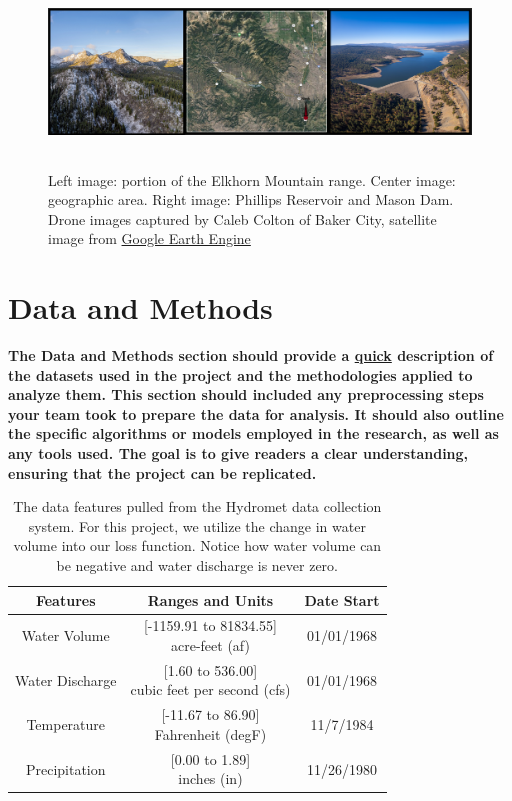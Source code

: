 \documentclass[10pt,twocolumn,letterpaper]{article}
\begin{document}
\begin{figure}[h!]
    \centering
    \includegraphics[width=\textwidth,height=5cm]{moun_mpa_res.png}
    \caption{Left image: portion of the Elkhorn Mountain range. Center image:  geographic area. Right image: Phillips Reservoir and Mason Dam. Drone images captured by Caleb Colton of Baker City, satellite image from \href{https://earth.google.com/web/@44.7920366,-117.99706468,1613.48832994a,83090.25038931d,35y,0h,0t,0r/data=OgMKATA}{Google Earth Engine} }
    \label{fig:enter-label}
\end{figure}

\section{Data and Methods}

\textbf{The Data and Methods section should provide a \underline{quick} description of the datasets used in the project and the methodologies applied to analyze them. This section should included any preprocessing steps your team took to prepare the data for analysis. It should also outline the specific algorithms or models employed in the research, as well as any tools used. The goal is to give readers a clear understanding, ensuring that the project can be replicated.}

\def\arraystretch{1.5}
\begin{table}
\begin{center}
\small
\begin{tabular}{|c|c|c|}
\hline
\textbf{Features} & \textbf{Ranges and Units} & \textbf{Date Start} \\
\hline\hline
Water Volume &  \makecell{[-1159.91 to 81834.55] \\ acre-feet (af)} & 01/01/1968 \\
\hline
Water Discharge &  \makecell{[1.60 to 536.00] \\ cubic feet per second (cfs)} & 01/01/1968 \\
\hline
Temperature & \makecell{[-11.67 to 86.90] \\ Fahrenheit (degF)} & 11/7/1984\\
\hline
Precipitation & \makecell{[0.00 to  1.89] \\inches (in)} & 11/26/1980 \\
\hline
\end{tabular}
\caption{The data features pulled from the Hydromet data collection system. For this project, we utilize the change in water volume into our loss function. Notice how water volume can be negative and water discharge is never zero. \cite{Hydromet}}
\end{center}
\end{table}
\end{document}
